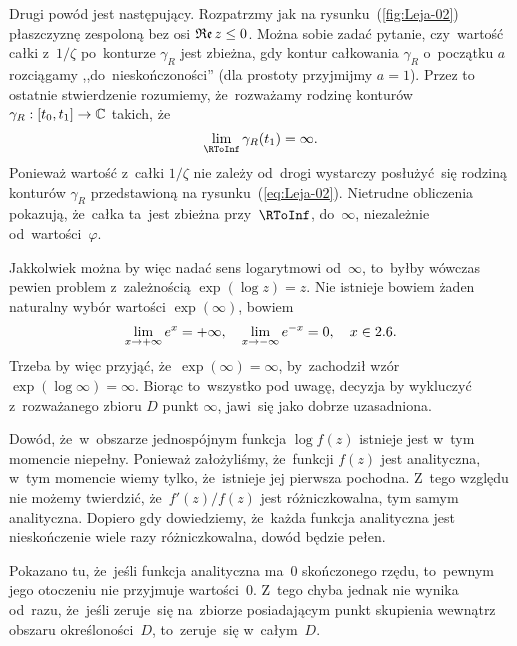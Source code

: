 \documentclass[a4paper,11pt]{article}
\begin{document}
Drugi powód jest następujący. Rozpatrzmy jak na
rysunku~(\ref{fig:Leja-02}) płaszczyznę zespoloną bez osi
$\mathfrak{Re}\, z \leq 0$. Można sobie zadać pytanie, czy~wartość całki
z~$1 / \zeta$ po~konturze $\gamma_{ R }$ jest zbieżna, gdy kontur
całkowania $\gamma_{ R }$ o~początku $a$ rozciągamy
,,do~nieskończoności'' (dla prostoty przyjmijmy $a = 1$). Przez to
ostatnie stwierdzenie rozumiemy, że~rozważamy rodzinę konturów
$\gamma_{ R }: [ t_{ 0 }, t_{ 1 } ] \to \mathbb{C}$ takich, że
\begin{equation}
  \label{eq:Leja-38}
  \Lim_{ \RToInf } \gamma_{ R }( t_{ 1 } ) = \infty.
\end{equation}
Ponieważ wartość z~całki $1 / \zeta$ nie zależy od~drogi wystarczy
posłużyć~się rodziną konturów $\gamma_{ R }$ przedstawioną na
rysunku~(\ref{eq:Leja-02}). Nietrudne obliczenia pokazują, że~całka
ta~jest zbieżna przy~$\RToInf$, do~$\infty$, niezależnie
od~wartości~$\varphi$.

Jakkolwiek można by więc nadać sens logarytmowi od~$\infty$, to~byłby
wówczas pewien problem z~zależnością $\exp( \log z ) = z$. Nie
istnieje bowiem żaden naturalny wybór wartości $\exp( \infty )$,
bowiem
\begin{equation}
  \label{eq:Leja-39}
  \begin{split}
    \lim\limits_{ x \to +\infty } e^{ x } = +\infty, \quad \lim\limits_{ x \to -\infty } e^{
      -x } = 0, \quad x \in 2.6.
  \end{split}
\end{equation}
Trzeba by więc przyjąć, że~$\exp( \infty ) = \infty$, by~zachodził
wzór $\exp( \log \infty ) = \infty$. Biorąc to~wszystko pod uwagę,
decyzja by wykluczyć z~rozważanego zbioru $D$ punkt $\infty$, jawi~się
jako dobrze uzasadniona.

\vspace{\spaceFour}


\start {} Dowód, że~w~obszarze jednospójnym funkcja
$\log f( z )$ istnieje jest w~tym momencie niepełny. Ponieważ
założyliśmy, że~funkcji $f( z )$ jest analityczna, w~tym momencie
wiemy tylko, że~istnieje jej pierwsza pochodna. Z~tego względu nie
możemy twierdzić, że~$f'( z ) / f( z )$ jest różniczkowalna, tym samym
analityczna. Dopiero gdy dowiedziemy, że~każda funkcja analityczna
jest nieskończenie wiele razy różniczkowalna, dowód będzie pełen.

\vspace{\spaceFour}


\start {} Pokazano tu, że~jeśli funkcja analityczna ma~0
skończonego rzędu, to~pewnym jego otoczeniu nie przyjmuje wartości~0.
Z~tego chyba jednak nie wynika od~razu, że~jeśli zeruje~się na~zbiorze
posiadającym punkt skupienia wewnątrz obszaru określoności~$D$,
to~zeruje~się w~całym~$D$.
\end{document}
